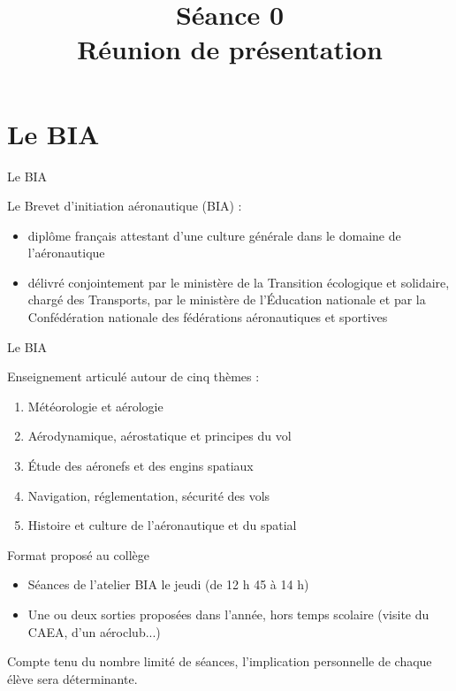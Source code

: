 

\title[Séance 0]{Séance 0 \\ Réunion de présentation}


 \begin{frame}
 \titlepage
 \end{frame}
 
 \begin{frame}
 \tableofcontents
 \end{frame}
 
\section{Le BIA}
\begin{frame}{Le BIA}

Le Brevet d'initiation aéronautique (BIA) :
\begin{itemize}
\item diplôme français attestant d'une culture générale dans le domaine de l'aéronautique
\item délivré conjointement par le ministère de la Transition écologique et solidaire, chargé des Transports, par le ministère de l'Éducation nationale et par la Confédération nationale des fédérations aéronautiques et sportives
\end{itemize}
\end{frame}

\begin{frame}{Le BIA}

Enseignement articulé autour de cinq thèmes :
\begin{enumerate}
\item Météorologie et aérologie
\item Aérodynamique, aérostatique et principes du vol
\item Étude des aéronefs et des engins spatiaux
\item Navigation, réglementation, sécurité des vols
\item Histoire et culture de l'aéronautique et du spatial
\end{enumerate}
\end{frame}

\begin{frame}{Format proposé au collège}
\begin{itemize}
	\item Séances de l'atelier BIA le jeudi (de 12 h 45 à 14 h)
	\item Une ou deux sorties proposées dans l'année, hors temps scolaire (visite du CAEA, d'un aéroclub...)
\end{itemize}

Compte tenu du nombre limité de séances, l'implication personnelle de chaque élève sera déterminante.

\end{frame}

